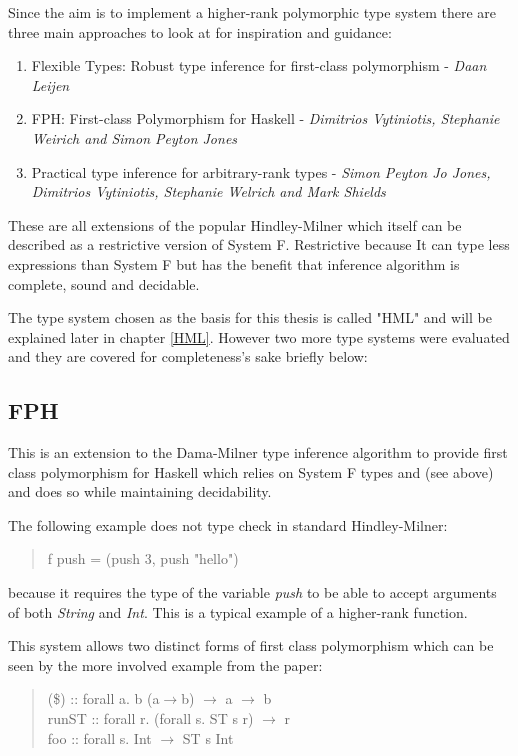 Since the aim is to implement a higher-rank polymorphic type system there are three main approaches to look at for inspiration and guidance:

\begin{enumerate}
\item Flexible Types: Robust type inference for first-class polymorphism - \textit{Daan Leijen}
\item FPH: First-class Polymorphism for Haskell - \textit{Dimitrios Vytiniotis, Stephanie Weirich and Simon Peyton Jones}
\item Practical type inference for arbitrary-rank types - \textit{Simon Peyton Jo Jones, Dimitrios Vytiniotis, Stephanie Welrich and Mark Shields}
\end{enumerate}

These are all extensions of the popular Hindley-Milner which itself can be described as a restrictive version of System F. Restrictive because It can type less expressions than System F but has the benefit that inference algorithm is complete, sound and decidable.

The type system chosen as the basis for this thesis is called "HML" and will be explained later in chapter \ref{HML}. However two more type systems were evaluated and they are covered for completeness's sake briefly below:

\subsection{FPH\cite{FPH}}

This is an extension to the Dama-Milner type inference algorithm to provide first class polymorphism for Haskell which relies on System F types and (see above) and does so while maintaining decidability. 

The following example does not type check in standard Hindley-Milner:
\begin{quotation}
f push = (push 3, push "hello")
\end{quotation}

because it requires the type of the variable \textit{push} to be able to accept arguments of both \textit{String} and \textit{Int}. This is a typical example of a higher-rank function. 

This system allows two distinct forms of first class polymorphism which can be seen by the more involved example from the paper\cite{FPH}:

\begin{quotation}
(\$) \hspace{13pt} :: forall a. b (a$\rightarrow$b) $\rightarrow$ a $\rightarrow$ b\\
\indent runST :: forall r. (forall s. ST s r) $\rightarrow$ r\\
\indent foo \hspace{13pt} :: forall s. Int $\rightarrow$ ST s Int
\end{quotation}

